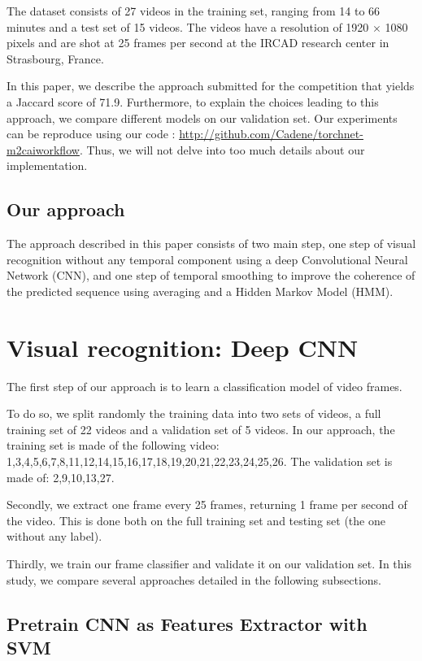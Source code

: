 \documentclass[10pt,twocolumn,letterpaper]{article}
\begin{document}
The dataset consists of 27 videos in the training set, ranging from 14 to 66
minutes and a test set of 15 videos. The videos have a resolution of 1920 $\times$
1080 pixels and are shot at 25 frames per second at the IRCAD research center in
Strasbourg, France.

In this paper, we describe the approach submitted for the competition that yields a Jaccard score of 71.9. Furthermore, to explain the choices leading to this approach, we compare different models on our validation set. Our experiments can be reproduce using our code : \url{http://github.com/Cadene/torchnet-m2caiworkflow}. Thus, we will not delve into too much details about our implementation.

\subsection{Our approach}

The approach described in this paper consists of two main step, one step of visual recognition without any temporal component using a deep Convolutional Neural Network (CNN), and one step of temporal smoothing to improve the coherence of the predicted sequence using averaging and a Hidden Markov Model (HMM).

\section{Visual recognition: Deep CNN}

The first step of our approach is to learn a classification model of video frames.

To do so, we split randomly the training data into two sets of videos, a full training set of 22 videos and a validation set of 5 videos. In our approach, the training set is made of the following video: 1,3,4,5,6,7,8,11,12,14,15,16,17,18,19,20,21,22,23,24,25,26. The validation set is made of: 2,9,10,13,27.

Secondly, we extract one frame every 25 frames, returning 1 frame per second of the video. This is done both on the full training set and testing set (the one without any label).

Thirdly, we train our frame classifier and validate it on our validation set. In this study, we compare several approaches detailed in the following subsections.

\subsection{Pretrain CNN as Features Extractor with SVM}
\end{document}
